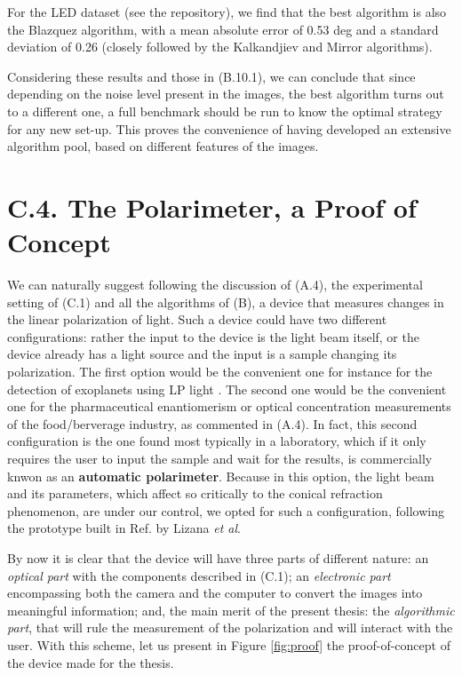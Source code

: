 \documentclass[11pt, a4paper, twoside]{article} %
\begin{document}
For the LED dataset (see the repository), we find that the best algorithm is also the Blazquez algorithm, with a mean absolute error of 0.53 deg and a standard deviation of 0.26 (closely followed by the Kalkandjiev and Mirror algorithms).\vspace{-0.06cm}

Considering these results and those in (B.10.1), we can conclude that since depending on the noise level present in the images, the best algorithm turns out to a different one, a full benchmark should be run to know the optimal strategy for any new set-up. This proves the convenience of having developed an extensive algorithm pool, based on different features of the images.
\newpage

\section*{C.4. The Polarimeter, a Proof of Concept\vspace{-0.1cm}} 
We can naturally suggest following the discussion of (A.4), the experimental setting of (C.1) and all the algorithms of (B), a device that measures changes in the linear polarization of light. Such a device could have two different configurations: rather the input to the device is the light beam itself, or the device already has a light source and the input is a sample changing its polarization. The first option would be the convenient one for instance for the detection of exoplanets using LP light \cite{exoplanets, exoplanets2}. The second one would be the convenient one for the pharmaceutical enantiomerism or optical concentration measurements of the food/berverage industry, as commented in (A.4). In fact, this second configuration is the one found most typically in a laboratory, which if it only requires the user to input the sample and wait for the results, is commercially knwon as an {\bf automatic polarimeter}. Because in this option, the light beam and its parameters, which affect so critically to the conical refraction phenomenon, are under our control, we opted for such a configuration, following the prototype built in Ref. \cite{incomplete} by Lizana {\em et al}.

By now it is clear that the device will have three parts of different nature: an {\em optical part} with the components described in (C.1); an {\em electronic part} encompassing both the camera and the computer to convert the images into meaningful information; and, the main merit of the present thesis: the {\em algorithmic part}, that will rule the measurement of the polarization and will interact with the user. With this scheme, let us present in Figure \ref{fig:proof} the proof-of-concept of the device made for the thesis.
\end{document}
